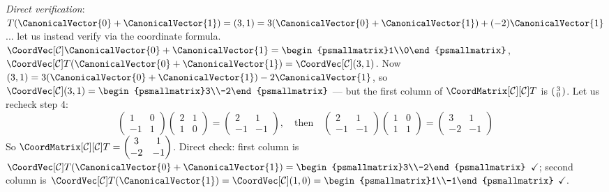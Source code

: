 \begin{example}
    \textit{Direct verification}: $T(\CanonicalVector{0}+\CanonicalVector{1}) = (3,1) = 3(\CanonicalVector{0}+\CanonicalVector{1}) + (-2)\CanonicalVector{1}$... let
    us instead verify via the coordinate formula.
    $\CoordVec[\mathcal{C}]{\CanonicalVector{0}+\CanonicalVector{1}} = \begin{psmallmatrix}1\\0\end{psmallmatrix}$,
    $\CoordVec[\mathcal{C}]{T(\CanonicalVector{0}+\CanonicalVector{1})} = \CoordVec[\mathcal{C}]{(3,1)}$.
    Now $(3,1) = 3(\CanonicalVector{0}+\CanonicalVector{1}) - 2 \CanonicalVector{1}$, so
    $\CoordVec[\mathcal{C}]{(3,1)} = \begin{psmallmatrix}3\\-2\end{psmallmatrix}$
    --- but the first column of $\CoordMatrix[\mathcal{C}][\mathcal{C}]{T}$ is
    $\begin{psmallmatrix}3\\0\end{psmallmatrix}$. Let us recheck step 4:
    \[
        \begin{pmatrix} 1 & 0 \\ -1 & 1 \end{pmatrix}
        \begin{pmatrix} 2 & 1 \\ 1 & 0 \end{pmatrix}
        = \begin{pmatrix} 2 & 1 \\ -1 & -1 \end{pmatrix},
        \quad \text{then} \quad
        \begin{pmatrix} 2 & 1 \\ -1 & -1 \end{pmatrix}
        \begin{pmatrix} 1 & 0 \\ 1 & 1 \end{pmatrix}
        = \begin{pmatrix} 3 & 1 \\ -2 & -1 \end{pmatrix}
    \]
    So $\CoordMatrix[\mathcal{C}][\mathcal{C}]{T} = \begin{pmatrix} 3 & 1 \\ -2 & -1 \end{pmatrix}$.
    Direct check: first column is $\CoordVec[\mathcal{C}]{T(\CanonicalVector{0}+\CanonicalVector{1})}
    = \begin{psmallmatrix}3\\-2\end{psmallmatrix}$ $\checkmark$; second column is
    $\CoordVec[\mathcal{C}]{T(\CanonicalVector{1})} = \CoordVec[\mathcal{C}]{(1,0)}
    = \begin{psmallmatrix}1\\-1\end{psmallmatrix}$ $\checkmark$.
\end{example}

